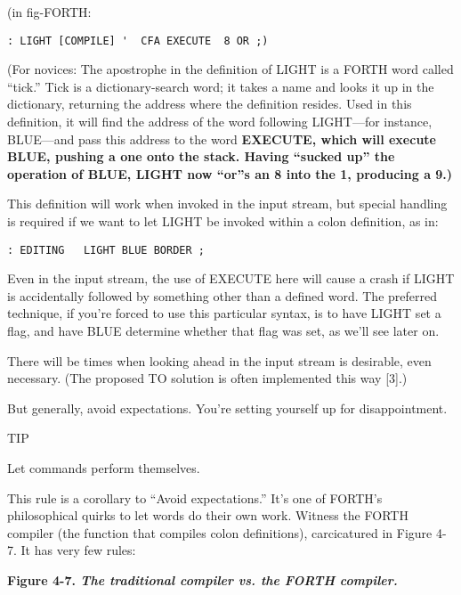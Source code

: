 (in fig-FORTH:

\begin{verbatim}
: LIGHT [COMPILE] '  CFA EXECUTE  8 OR ;)
\end{verbatim}

(For novices: The apostrophe in the definition of LIGHT is a FORTH
word called ``tick.'' Tick is a dictionary-search word; it takes a name and
looks it up in the dictionary, returning the address where the definition
resides. Used in this definition, it will find the address of the word
following LIGHT---for instance, BLUE---and pass this address to the word
\bf{EXECUTE}, which will execute BLUE, pushing a one onto the stack.
Having ``sucked up'' the operation of BLUE, LIGHT now ``or''s an 8 into
the 1, producing a 9.)

This definition will work when invoked in the input stream, but special
handling is required if we want to let LIGHT be invoked within a
colon definition, as in:

\begin{verbatim}
: EDITING   LIGHT BLUE BORDER ;
\end{verbatim}

Even in the input stream, the use of EXECUTE here will cause a crash if
LIGHT is accidentally followed by something other than a defined word.
The preferred technique, if you're forced to use this particular syntax,
is to have LIGHT set a flag, and have BLUE determine whether that
flag was set, as we'll see later on.

There will be times when looking ahead in the input stream is desirable,
even necessary. (The proposed TO solution is often implemented
this way [3].)

But generally, avoid expectations. You're setting yourself up for
disappointment.

TIP

Let commands perform themselves.

This rule is a corollary to ``Avoid expectations.'' It's one of
FORTH's philosophical quirks to let words do their own work. Witness
the FORTH compiler (the function that compiles colon definitions),
carcicatured in Figure 4-7. It has very few rules:

\bf{Figure 4-7.} \emph{The traditional compiler vs. the FORTH compiler.}


